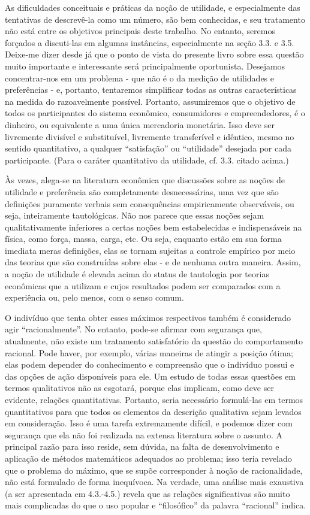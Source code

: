 \documentclass[a4paper,12pt]{article}[abntex2]
\begin{document}
As dificuldades conceituais e práticas da noção de utilidade, e especialmente das tentativas de descrevê-la como um número, são bem conhecidas, e seu tratamento não está entre os objetivos principais deste trabalho. No entanto, seremos forçados a discuti-las em algumas instâncias, especialmente na seção 3.3. e 3.5. Deixe-me dizer desde já que o ponto de vista do presente livro sobre essa questão muito importante e interessante será principalmente oportunista. Desejamos concentrar-nos em um problema - que não é o da medição de utilidades e preferências - e, portanto, tentaremos simplificar todas as outras características na medida do razoavelmente possível. Portanto, assumiremos que o objetivo de todos os participantes do sistema econômico, consumidores e empreendedores, é o dinheiro, ou equivalente a uma única mercadoria monetária. Isso deve ser livremente divisível e substituível, livremente transferível e idêntico, mesmo no sentido quantitativo, a qualquer “satisfação” ou “utilidade” desejada por cada participante. (Para o caráter quantitativo da utilidade, cf. 3.3. citado acima.)

Às vezes, alega-se na literatura econômica que discussões sobre as noções de utilidade e preferência são completamente desnecessárias, uma vez que são definições puramente verbais sem consequências empiricamente observáveis, ou seja, inteiramente tautológicas. Não nos parece que essas noções sejam qualitativamente inferiores a certas noções bem estabelecidas e indispensáveis na física, como força, massa, carga, etc. Ou seja, enquanto estão em sua forma imediata meras definições, elas se tornam sujeitas a controle empírico por meio das teorias que são construídas sobre elas - e de nenhuma outra maneira. Assim, a noção de utilidade é elevada acima do status de tautologia por teorias econômicas que a utilizam e cujos resultados podem ser comparados com a experiência ou, pelo menos, com o senso comum.

O indivíduo que tenta obter esses máximos respectivos também é considerado agir “racionalmente”. No entanto, pode-se afirmar com segurança que, atualmente, não existe um tratamento satisfatório da questão do comportamento racional. Pode haver, por exemplo, várias maneiras de atingir a posição ótima; elas podem depender do conhecimento e compreensão que o indivíduo possui e das opções de ação disponíveis para ele. Um estudo de todas essas questões em termos qualitativos não as esgotará, porque elas implicam, como deve ser evidente, relações quantitativas. Portanto, seria necessário formulá-las em termos quantitativos para que todos os elementos da descrição qualitativa sejam levados em consideração. Isso é uma tarefa extremamente difícil, e podemos dizer com segurança que ela não foi realizada na extensa literatura sobre o assunto. A principal razão para isso reside, sem dúvida, na falta de desenvolvimento e aplicação de métodos matemáticos adequados ao problema; isso teria revelado que o problema do máximo, que se supõe corresponder à noção de racionalidade, não está formulado de forma inequívoca. Na verdade, uma análise mais exaustiva (a ser apresentada em 4.3.-4.5.) revela que as relações significativas são muito mais complicadas do que o uso popular e “filosófico” da palavra “racional” indica.
\end{document}
